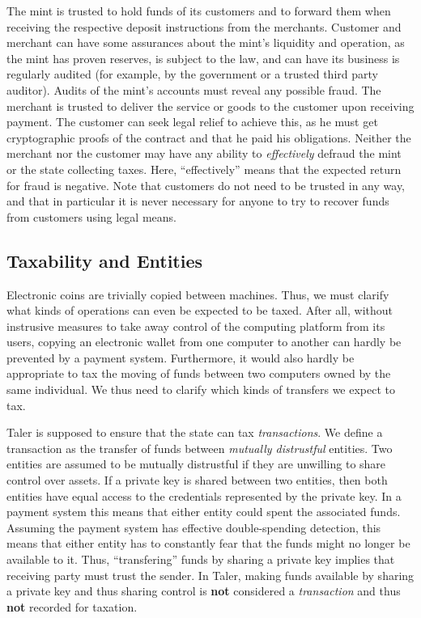 \documentclass{llncs}
\begin{document}
The mint is trusted to hold funds of its customers and to forward them
when receiving the respective deposit instructions from the merchants.
Customer and merchant can have some assurances about the mint's
liquidity and operation, as the mint has proven reserves, is subject
to the law, and can have its business is regularly audited (for
example, by the government or a trusted third party auditor).
Audits of the mint's accounts must reveal any possible fraud.
%
The merchant is trusted to deliver the service or goods to the
customer upon receiving payment.  The customer can seek legal relief
to achieve this, as he must get cryptographic proofs of the contract
and that he paid his obligations.
%
Neither the merchant nor the customer may have any ability to {\em
  effectively} defraud the mint or the state collecting taxes.  Here,
``effectively'' means that the expected return for fraud is negative.
%
Note that customers do not need to be trusted in any way, and that in
particular it is never necessary for anyone to try to recover funds
from customers using legal means.


\subsection{Taxability and Entities}

Electronic coins are trivially copied between machines.  Thus, we must
clarify what kinds of operations can even be expected to be taxed.
After all, without instrusive measures to take away control of the
computing platform from its users, copying an electronic wallet from
one computer to another can hardly be prevented by a payment system.
Furthermore, it would also hardly be appropriate to tax the moving of
funds between two computers owned by the same individual.  We thus
need to clarify which kinds of transfers we expect to tax.

Taler is supposed to ensure that the state can tax {\em transactions}.
We define a transaction as the transfer of funds between {\em mutually
  distrustful} entities.  Two entities are assumed to be mutually
distrustful if they are unwilling to share control over assets.  If a
private key is shared between two entities, then both entities have
equal access to the credentials represented by the private key.  In a
payment system this means that either entity could spent the
associated funds.  Assuming the payment system has effective
double-spending detection, this means that either entity has to
constantly fear that the funds might no longer be available to it.
Thus, ``transfering'' funds by sharing a private key implies that
receiving party must trust the sender.  In Taler, making funds
available by sharing a private key and thus sharing control is {\bf
  not} considered a {\em transaction} and thus {\bf not} recorded for
taxation.
\end{document}
